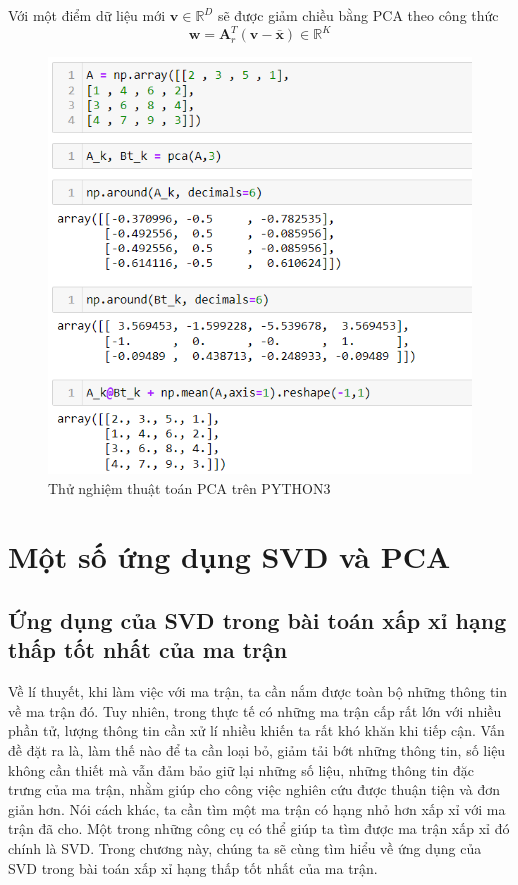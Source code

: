 \documentclass[12pt,a4paper,oneside]{report}
\numberwithin{equation}{section}
\def\R{\mathbb{R}}
\begin{document}
Với một điểm dữ liệu mới $\mathbf{v} \in \R^D$ sẽ
được giảm chiều bằng PCA theo công thức 
\begin{equation} \label{chieu}
	\mathbf{w} = \mathbf{A}_r^T(\mathbf{v} - \bar{\mathbf{x}}) \in
	\R^K
\end{equation} 
\begin{figure}[htp]
	\centering
	\includegraphics[scale=0.8]{example_pca.png}
	\caption{Thử nghiệm thuật toán PCA trên PYTHON3}
	\label{fig:pca_example}
\end{figure}
\chapter{ Một số ứng dụng SVD và PCA }

\section{Ứng dụng của SVD trong bài toán xấp xỉ hạng thấp tốt nhất của ma trận}

Về lí thuyết, khi làm việc với ma trận, ta cần nắm được toàn bộ những thông tin về ma trận đó. Tuy nhiên, trong thực tế có những ma trận cấp rất lớn với nhiều phần tử, lượng thông tin cần xử lí nhiều khiến ta rất khó khăn khi tiếp cận. Vấn đề đặt ra là, làm thế nào để ta cần loại bỏ, giảm tải bớt những thông tin, số liệu không cần thiết mà vẫn đảm bảo giữ lại những số liệu, những thông tin đặc trưng của ma trận, nhằm giúp cho công việc nghiên cứu được thuận tiện và đơn giản hơn. Nói cách khác, ta cần tìm một ma trận có hạng nhỏ hơn xấp xỉ với ma trận đã cho. Một trong những công cụ có thể giúp ta tìm được ma trận xấp xỉ đó chính là SVD. Trong chương này, chúng ta sẽ cùng tìm hiểu về ứng dụng của SVD trong bài toán xấp xỉ hạng thấp tốt nhất của ma trận. 
\end{document}
